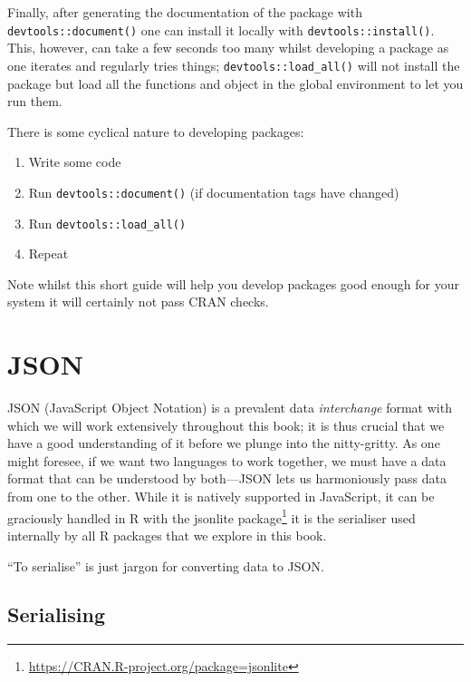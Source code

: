 \documentclass[10pt,]{krantz}
\makeatletter
\providecommand{\tightlist}{%
  \setlength{\itemsep}{0pt}\setlength{\parskip}{0pt}}
\renewcommand{\href}[2]{#2\footnote{\url{#1}}}
\newenvironment{kframe}{%
\medskip{}
\setlength{\fboxsep}{.8em}
 \def\at@end@of@kframe{}%
 \ifinner\ifhmode%
  \def\at@end@of@kframe{\end{minipage}}%
  \begin{minipage}{\columnwidth}%
 \fi\fi%
 \def\FrameCommand##1{\hskip\@totalleftmargin \hskip-\fboxsep
 \colorbox{shadecolor}{##1}\hskip-\fboxsep
     \hskip-\linewidth \hskip-\@totalleftmargin \hskip\columnwidth}%
 \MakeFramed {\advance\hsize-\width
   \@totalleftmargin\z@ \linewidth\hsize
   \@setminipage}}%
 {\par\unskip\endMakeFramed%
 \at@end@of@kframe}
\newenvironment{rmdblock}[1]
  {
  \begin{itemize}
  \renewcommand{\labelitemi}{
    \raisebox{-.7\height}[0pt][0pt]{
      {\setkeys{Gin}{width=3em,keepaspectratio}\texttt{[image: images/\#1]}}
    }
  }
  \setlength{\fboxsep}{1em}
  \begin{kframe}
  \item
  }
  {
  \end{kframe}
  \end{itemize}
  }
\newenvironment{rmdnote}
  {\begin{rmdblock}{note}}
  {\end{rmdblock}}
\makeatother
\begin{document}
Finally, after generating the documentation of the package with \texttt{devtools::document()} one can install it locally with \texttt{devtools::install()}. This, however, can take a few seconds too many whilst developing a package as one iterates and regularly tries things; \texttt{devtools::load\_all()} will not install the package but load all the functions and object in the global environment to let you run them.

There is some cyclical nature to developing packages:

\begin{enumerate}
\def\labelenumi{\arabic{enumi}.}
\tightlist
\item
  Write some code
\item
  Run \texttt{devtools::document()} (if documentation tags have changed)
\item
  Run \texttt{devtools::load\_all()}
\item
  Repeat
\end{enumerate}

Note whilst this short guide will help you develop packages good enough for your system it will certainly not pass CRAN checks.

\hypertarget{basics-json}{%
\section{JSON}\label{basics-json}}

JSON (JavaScript Object Notation) is a prevalent data \emph{interchange} format with which we will work extensively throughout this book; it is thus crucial that we have a good understanding of it before we plunge into the nitty-gritty. As one might foresee, if we want two languages to work together, we must have a data format that can be understood by both---JSON lets us harmoniously pass data from one to the other. While it is natively supported in JavaScript, it can be graciously handled in R with the \href{https://CRAN.R-project.org/package=jsonlite}{jsonlite package} \citep{R-jsonlite} it is the serialiser used internally by all R packages that we explore in this book.

\begin{rmdnote}
``To serialise'' is just jargon for converting data to JSON.
\end{rmdnote}

\hypertarget{serialising}{%
\subsection{Serialising}\label{serialising}}
\end{document}
